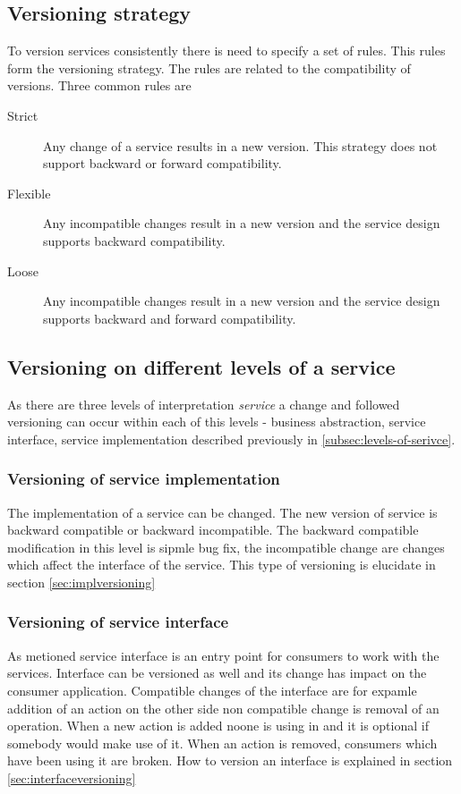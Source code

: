 \subsection{Versioning strategy}
To version services consistently there is need to specify a set of rules. This rules form the versioning strategy. The rules are related to the compatibility of versions. 
Three common rules are %

\begin{description}
  \item[Strict] 
  Any change of a service results in a new version. This strategy does not support backward or forward compatibility.
  \item[Flexible]
  Any incompatible changes result in a new version and the service design supports backward compatibility.
  \item[Loose]
  Any incompatible changes result in a new version and the service design supports backward and forward compatibility.
  
\end{description}


\subsection{Versioning on different levels of a service}
As there are three levels of interpretation \emph{service} a change and followed versioning can occur within each of this levels - business abstraction, service interface, service implementation described previously in \ref{subsec:levels-of-serivce}.

\subsubsection{\textbf{Versioning of service implementation}}
The implementation of a service can be changed. The new version of service is backward compatible or backward incompatible. The backward compatible modification in this level is sipmle bug fix, the incompatible change are changes which affect the interface of the service. This type of versioning is elucidate in section \ref{sec:implversioning}

\subsubsection{\textbf{Versioning of service interface}}
As metioned service interface is an entry point for consumers to work with the services. Interface can be versioned as well and its change has impact on the consumer application. Compatible changes of the interface are for expamle addition of an action on the other side non compatible change is removal of an operation. When a new action is added noone is using in and it is optional if somebody would make use of it. When an action is removed, consumers which have been using it are broken. How to version an interface is explained in section \ref{sec:interfaceversioning}


